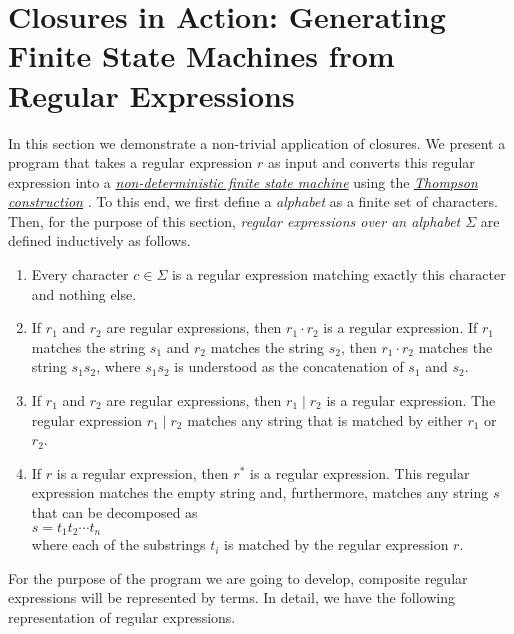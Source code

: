 \section[Closures in Action]{Closures in Action: Generating Finite State Machines from Regular Expressions}
In this section we demonstrate a non-trivial application of closures.  We present a program that
takes a regular expression $r$ as input and  converts this regular expression into a
\href{http://en.wikipedia.org/wiki/Nondeterministic_finite_automaton}{\emph{non-deterministic finite state machine}} 
using the 
\href{http://en.wikipedia.org/wiki/Thompson's_construction_algorithm}{\emph{Thompson construction}}
\cite{hopcroft:06}.  To this end, we first define a \emph{alphabet} as a finite set of characters.
Then, for the purpose of this section, \emph{regular expressions over an alphabet $\Sigma$} are
defined inductively as follows. 
\begin{enumerate}
\item Every character $c\in \Sigma$ is a regular expression matching exactly this character and
      nothing else.
\item If $r_1$ and $r_2$ are regular expressions,  then $r_1 \cdot r_2$ is a regular
      expression.  If $r_1$ matches the string $s_1$ and $r_2$ matches the string $s_2$,
      then $r_1 \cdot r_2$ matches the string $s_1s_2$, where $s_1s_2$ is understood as
      the concatenation of $s_1$ and $s_2$.
\item If $r_1$ and $r_2$ are regular expressions,  then $r_1 \mid r_2$ is a regular
      expression.  The regular expression $r_1 \mid r_2$ matches any string that is matched
      by either $r_1$ or $r_2$.
\item If $r$ is a regular expression, then $r^*$ is a regular expression.
      This regular expression matches the empty string and, furthermore, matches any string
      $s$ that can be decomposed as
      \\[0.2cm]
      \hspace*{1.3cm}
      $s = t_1 t_2 \cdots t_n$
      \\[0.2cm]
      where each of the substrings $t_i$ is matched by the regular expression $r$.
\end{enumerate}
For the purpose of the program we are going to develop, composite regular expressions will be
represented by terms.  In detail, we have the following representation of regular
expressions.
